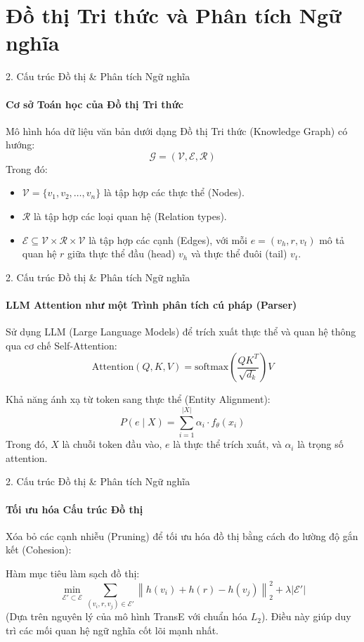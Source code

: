 \documentclass[aspectratio=169,xcolor=table]{beamer}
\begin{document}
\section{Đồ thị Tri thức và Phân tích Ngữ nghĩa}

\begin{frame}{2. Cấu trúc Đồ thị \& Phân tích Ngữ nghĩa}
    \framesubtitle{Cơ sở Toán học của Đồ thị Tri thức}
    Mô hình hóa dữ liệu văn bản dưới dạng Đồ thị Tri thức (Knowledge Graph) có hướng:
    \begin{equation}
        \mathcal{G} = (\mathcal{V}, \mathcal{E}, \mathcal{R})
    \end{equation}
    Trong đó:
    \begin{itemize}
        \item $\mathcal{V} = \{v_1, v_2, \dots, v_n\}$ là tập hợp các thực thể (Nodes).
        \item $\mathcal{R}$ là tập hợp các loại quan hệ (Relation types).
        \item $\mathcal{E} \subseteq \mathcal{V} \times \mathcal{R} \times \mathcal{V}$ là tập hợp các cạnh (Edges), với mỗi $e = (v_h, r, v_t)$ mô tả quan hệ $r$ giữa thực thể đầu (head) $v_h$ và thực thể đuôi (tail) $v_t$.
    \end{itemize}
\end{frame}

\begin{frame}{2. Cấu trúc Đồ thị \& Phân tích Ngữ nghĩa}
    \framesubtitle{LLM Attention như một Trình phân tích cú pháp (Parser)}
    Sử dụng LLM (Large Language Models) để trích xuất thực thể và quan hệ thông qua cơ chế Self-Attention:
    \begin{equation}
        \text{Attention}(Q, K, V) = \text{softmax}\left(\frac{QK^T}{\sqrt{d_k}}\right)V
    \end{equation}
    
    Khả năng ánh xạ từ token sang thực thể (Entity Alignment):
    \begin{equation}
        P(e \mid X) = \sum_{i=1}^{|X|} \alpha_{i} \cdot f_{\theta}(x_i)
    \end{equation}
    Trong đó, $X$ là chuỗi token đầu vào, $e$ là thực thể trích xuất, và $\alpha_{i}$ là trọng số attention.
\end{frame}

\begin{frame}{2. Cấu trúc Đồ thị \& Phân tích Ngữ nghĩa}
    \framesubtitle{Tối ưu hóa Cấu trúc Đồ thị}
    Xóa bỏ các cạnh nhiễu (Pruning) để tối ưu hóa đồ thị bằng cách đo lường độ gắn kết (Cohesion):
    
    Hàm mục tiêu làm sạch đồ thị:
    \begin{equation}
        \min_{\mathcal{E}' \subset \mathcal{E}} \sum_{(v_i, r, v_j) \in \mathcal{E}'} \left\| h(v_i) + h(r) - h(v_j) \right\|_2^2 + \lambda |\mathcal{E}'|
    \end{equation}
    (Dựa trên nguyên lý của mô hình TransE với chuẩn hóa $L_2$).
    Điều này giúp duy trì các mối quan hệ ngữ nghĩa cốt lõi mạnh nhất.
\end{frame}
\end{document}
